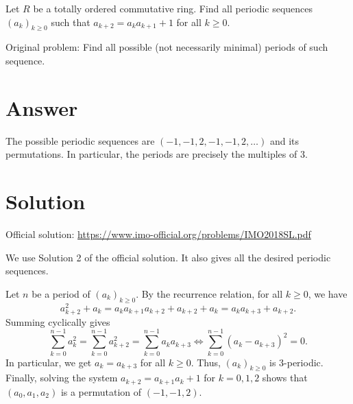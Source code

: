 Let $R$ be a totally ordered commutative ring.
Find all periodic sequences $(a_k)_{k \geq 0}$ such that $a_{k + 2} = a_k a_{k + 1} + 1$ for all $k \geq 0$.

Original problem: Find all possible (not necessarily minimal) periods of such sequence.



\section*{Answer}

The possible periodic sequences are $(-1, -1, 2, -1, -1, 2, \ldots)$ and its permutations.
In particular, the periods are precisely the multiples of $3$.



\section*{Solution}

Official solution: \url{https://www.imo-official.org/problems/IMO2018SL.pdf}

We use Solution 2 of the official solution.
It also gives all the desired periodic sequences.

Let $n$ be a period of $(a_k)_{k \geq 0}$.
By the recurrence relation, for all $k \geq 0$, we have
\[ a_{k + 2}^2 + a_k = a_k a_{k + 1} a_{k + 2} + a_{k + 2} + a_k = a_k a_{k + 3} + a_{k + 2}. \]
Summing cyclically gives
\[ \sum_{k = 0}^{n - 1} a_k^2 = \sum_{k = 0}^{n - 1} a_{k + 2}^2 = \sum_{k = 0}^{n - 1} a_k a_{k + 3} \iff \sum_{k = 0}^{n - 1} (a_k - a_{k + 3})^2 = 0. \]
In particular, we get $a_k = a_{k + 3}$ for all $k \geq 0$.
Thus, $(a_k)_{k \geq 0}$ is $3$-periodic.
Finally, solving the system $a_{k + 2} = a_{k + 1} a_k + 1$ for $k = 0, 1, 2$ shows that $(a_0, a_1, a_2)$ is a permutation of $(-1, -1, 2)$.
